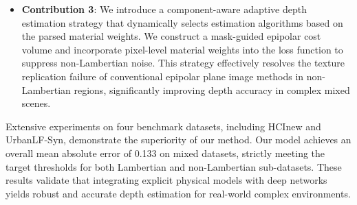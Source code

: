\begin{itemize}\item \textbf{Contribution 3}: We introduce a component-aware adaptive depth estimation strategy that dynamically selects estimation algorithms based on the parsed material weights. We construct a mask-guided epipolar cost volume and incorporate pixel-level material weights into the loss function to suppress non-Lambertian noise. This strategy effectively resolves the texture replication failure of conventional epipolar plane image methods in non-Lambertian regions, significantly improving depth accuracy in complex mixed scenes.\end{itemize}

Extensive experiments on four benchmark datasets, including HCInew and UrbanLF-Syn, demonstrate the superiority of our method. Our model achieves an overall mean absolute error of 0.133 on mixed datasets, strictly meeting the target thresholds for both Lambertian and non-Lambertian sub-datasets. These results validate that integrating explicit physical models with deep networks yields robust and accurate depth estimation for real-world complex environments.
